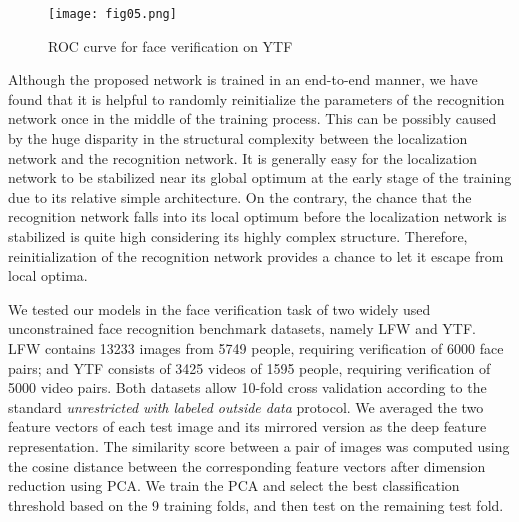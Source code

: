 \documentclass[10pt,twocolumn,letterpaper]{article}
\begin{document}
\begin{figure}[b]
\begin{center}
\texttt{[image: fig05.png]}
\end{center}
   \caption{ROC curve for face verification on YTF}
\label{fig05}
\end{figure}

Although the proposed network is trained in an end-to-end manner,
we have found that it is helpful to randomly reinitialize the parameters of the recognition network once in the middle of the training process.	
This can be possibly caused by the huge disparity in the structural complexity between the localization network and the recognition network.
It is generally easy for the localization network to be stabilized near its global optimum at the early stage of the training due to its relative simple architecture. 
On the contrary, the chance that the recognition network falls into its local optimum before the localization network is stabilized is quite high considering its highly complex structure.
Therefore, reinitialization of the recognition network provides a chance to let it escape from local optima.

We tested our models in the face verification task of two widely used unconstrained face recognition benchmark datasets, namely LFW and YTF. LFW contains 13233 images from 5749 people, requiring verification of 6000 face pairs; and YTF consists of 3425 videos of 1595 people, requiring verification of 5000 video pairs.
Both datasets allow 10-fold cross validation according to the standard \emph{unrestricted with labeled outside data} protocol. 
We averaged the two feature vectors of each test image and its mirrored version as the deep feature representation. 
The similarity score between a pair of images was computed using the cosine distance between the corresponding feature vectors after dimension reduction using PCA.
We train the PCA and select the best classification threshold based on the 9 training folds, and then test on the remaining test fold.
\end{document}
